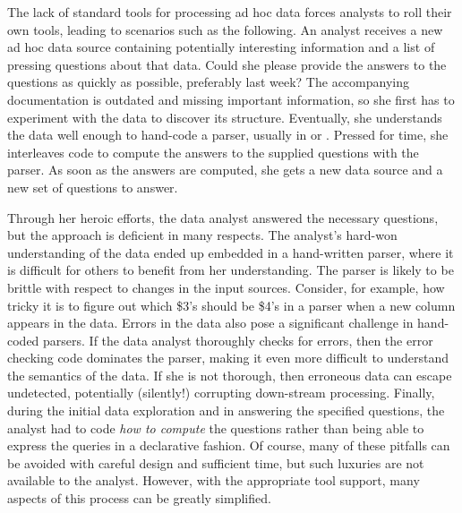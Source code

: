 The lack of standard tools for processing ad hoc data forces
analysts to roll their own tools, leading to scenarios such as the
following.  An analyst receives a new ad hoc data source containing
potentially interesting information and a list of pressing questions
about that data.  Could she please provide the answers to the
questions as quickly as possible, preferably last week?  The
accompanying documentation is outdated and missing important
information, so she first has to experiment with the data to discover
its structure.   Eventually, she understands the data well enough to hand-code a
parser, usually in \C{} or \perl{}.  Pressed for time, she interleaves
code to compute the answers to the supplied questions with the parser.
As soon as the answers are computed, she gets a new data source and a
new set of questions to answer.

Through her heroic efforts, the data analyst answered
the necessary questions, but the approach is deficient in many
respects.  
The analyst's hard-won understanding of the data ended up embedded in
a hand-written parser, where it is difficult for others to benefit
from her understanding.
The parser is likely to be brittle with respect to changes in the
input sources.  Consider, for example, how tricky it is to
figure out which \$3's should be \$4's in a \perl{} parser when a new
column appears in the data.
Errors in the data also pose a significant challenge in hand-coded
parsers.  If the data analyst thoroughly checks for errors, then
the error checking code dominates the parser, making it even more
difficult to understand the semantics of the data.  If she is not thorough,
then erroneous data can escape undetected, potentially (silently!)
corrupting down-stream processing.
Finally, during the initial data exploration and in answering the
specified questions, the analyst had to code \textit{how to compute}
the questions rather than being able to express the queries in a
declarative fashion. 
Of course, many of these pitfalls can be avoided with careful design
and sufficient time, but such luxuries are not available to the analyst.
However, with the appropriate tool support, many aspects of this
process can be greatly simplified.



